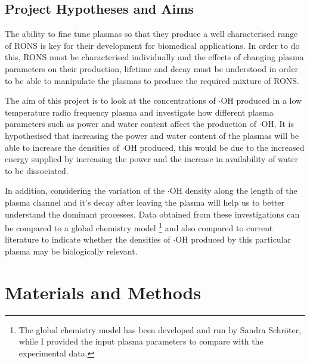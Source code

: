 \documentclass[11pt, oneside]{article}   	%
\begin{document}
\subsection{Project Hypotheses and Aims}

The ability to fine tune plasmas so that they produce a well characterised range of RONS is key for their development for biomedical applications.
In order to do this, RONS must be characterised individually and the effects of changing plasma parameters on their production, lifetime and decay must be understood in order to be able to manipulate the plasmas to produce the required mixture of RONS.

The aim of this project is to look at the concentrations of $\cdot$OH produced in a low temperature radio frequency plasma and investigate how different plasma parameters such as power and water content affect the production of $\cdot$OH.
It is hypothesised that increasing the power and water content of the plasmas will be able to increase the densities of $\cdot$OH produced, this would be due to the increased energy supplied by increasing the power and the increase in availability of water to be dissociated.

In addition, considering the variation of the $\cdot$OH density along the length of the plasma channel and it's decay after leaving the plasma will help us to better understand the dominant processes.
Data obtained from these investigations can be compared to a global chemistry model \footnote{The global chemistry model has been developed and run by Sandra Schr\"{o}ter, while I provided the input plasma parameters to compare with the experimental data.} and also compared to current literature to indicate whether the densities of $\cdot$OH produced by this particular plasma may be biologically relevant.


\section{Materials and Methods}
\end{document}
